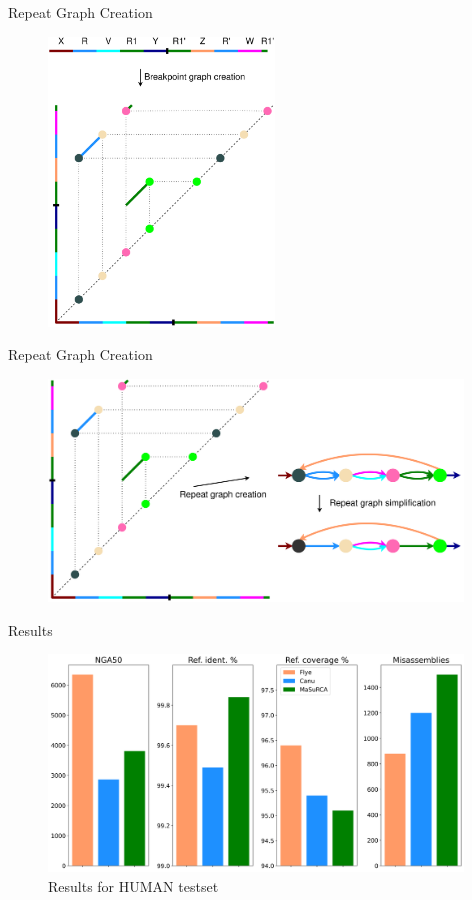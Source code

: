 \documentclass{beamer}
\begin{document}
  \begin{frame}{Repeat Graph Creation}
    \begin{figure}
      \includegraphics[width=6cm]{presentation/images/breakpoint_graph.png}
      \label{fig:bp_graph}
    \end{figure}
  \end{frame}

  \begin{frame}{Repeat Graph Creation}
    \begin{figure}
      \includegraphics[width=11cm]{presentation/images/repeat_graph.png}
      \label{fig:repeat_graph}
    \end{figure}
  \end{frame}

  \begin{frame}{Results}
    \begin{figure}
      \includegraphics[width=11cm]{presentation/images/results_HUMAN.png}
      \caption{Results for HUMAN testset}
      \label{fig:results}
    \end{figure}
  \end{frame}
\end{document}
